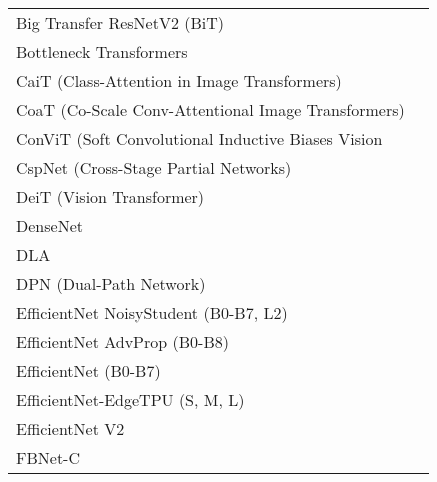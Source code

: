 \begin{table}[]
    \begin{tabular}{ll}
    Big Transfer ResNetV2 (BiT)                                              & \cite{srinivas_bottleneck_2021}          \\
    Bottleneck Transformers                                                  & \cite{kolesnikov_big_2020}               \\
    CaiT (Class-Attention in Image Transformers)                             & \cite{DBLP:journals/corr/abs-2103-17239} \\
    CoaT (Co-Scale Conv-Attentional Image Transformers)                      & \cite{xu_co-scale_2021}                  \\
    ConViT (Soft Convolutional Inductive Biases Vision                       & \cite{dascoli_convit_2021}               \\
    CspNet (Cross-Stage Partial Networks)                                    & \cite{wang_cspnet_2019}                  \\
    DeiT (Vision Transformer)                                                & \cite{dascoli_convit_2021}               \\
    DenseNet                                                                 & \cite{DBLP:journals/corr/HuangLW16a}     \\
    DLA                                                                      & \cite{yu_deep_2019}                      \\
    DPN (Dual-Path Network)                                                  & \cite{chen_dual_2017}                    \\
    EfficientNet NoisyStudent (B0-B7, L2)                                    & \cite{xie_self-training_2020}            \\
    EfficientNet AdvProp (B0-B8)                                             & \cite{xie_adversarial_2020}              \\
    EfficientNet (B0-B7)                                                     & \cite{tan_efficientnet_2020}             \\
    EfficientNet-EdgeTPU (S, M, L)                                           & \cite{google_ai_blog_2019}               \\
    EfficientNet V2                                                          & \cite{tan_efficientnetv2_2021}           \\
    FBNet-C                                                                  & \cite{wu_fbnet_2019}                     \\

\end{tabular}
\end{table}
